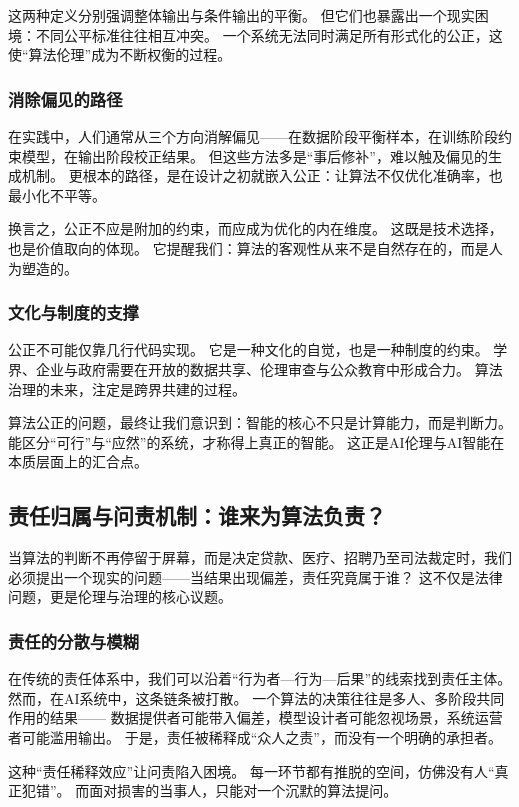 这两种定义分别强调整体输出与条件输出的平衡。
但它们也暴露出一个现实困境：不同公平标准往往相互冲突。
一个系统无法同时满足所有形式化的公正，这使“算法伦理”成为不断权衡的过程。

\subsubsection{消除偏见的路径}

在实践中，人们通常从三个方向消解偏见——在数据阶段平衡样本，在训练阶段约束模型，在输出阶段校正结果。
但这些方法多是“事后修补”，难以触及偏见的生成机制。
更根本的路径，是在设计之初就嵌入公正：让算法不仅优化准确率，也最小化不平等。

换言之，公正不应是附加的约束，而应成为优化的内在维度。
这既是技术选择，也是价值取向的体现。
它提醒我们：算法的客观性从来不是自然存在的，而是人为塑造的。

\subsubsection{文化与制度的支撑}

公正不可能仅靠几行代码实现。
它是一种文化的自觉，也是一种制度的约束。
学界、企业与政府需要在开放的数据共享、伦理审查与公众教育中形成合力。
算法治理的未来，注定是跨界共建的过程。

算法公正的问题，最终让我们意识到：智能的核心不只是计算能力，而是判断力。
能区分“可行”与“应然”的系统，才称得上真正的智能。
这正是AI伦理与AI智能在本质层面上的汇合点。

\subsection{责任归属与问责机制：谁来为算法负责？}

当算法的判断不再停留于屏幕，而是决定贷款、医疗、招聘乃至司法裁定时，我们必须提出一个现实的问题——当结果出现偏差，责任究竟属于谁？
这不仅是法律问题，更是伦理与治理的核心议题。

\subsubsection{责任的分散与模糊}

在传统的责任体系中，我们可以沿着“行为者—行为—后果”的线索找到责任主体。
然而，在AI系统中，这条链条被打散。
一个算法的决策往往是多人、多阶段共同作用的结果——
数据提供者可能带入偏差，模型设计者可能忽视场景，系统运营者可能滥用输出。
于是，责任被稀释成“众人之责”，而没有一个明确的承担者。

这种“责任稀释效应”让问责陷入困境。
每一环节都有推脱的空间，仿佛没有人“真正犯错”。
而面对损害的当事人，只能对一个沉默的算法提问。

